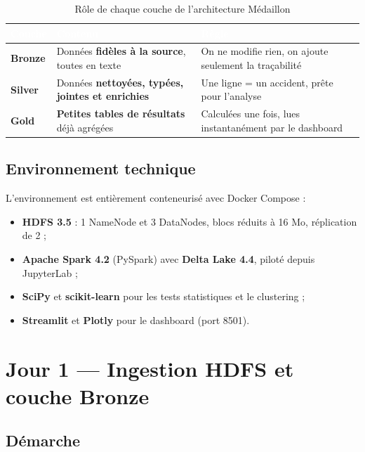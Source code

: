 \documentclass[11pt,a4paper]{report}
\newcommand{\hd}[1]{\textcolor{white}{\bfseries #1}}
\newcommand{\headrow}{\rowcolor{primary}}
\begin{document}
\begin{table}[H]
\centering
{}
\begin{tabularx}{\textwidth}{@{}l X X@{}}
\toprule
\headrow \hd{Couche} & \hd{Contenu} & \hd{Règle} \\
\midrule
\textcolor{bronzec}{\bfseries Bronze} & Données \textbf{fidèles à la source}, toutes en texte & On ne modifie rien, on ajoute seulement la traçabilité \\
\textcolor{silverc!70!black}{\bfseries Silver} & Données \textbf{nettoyées, typées, jointes et enrichies} & Une ligne = un accident, prête pour l'analyse \\
\textcolor{goldc!80!black}{\bfseries Gold} & \textbf{Petites tables de résultats} déjà agrégées & Calculées une fois, lues instantanément par le dashboard \\
\bottomrule
\end{tabularx}
\caption{Rôle de chaque couche de l'architecture Médaillon}
\end{table}

\section{Environnement technique}

L'environnement est entièrement conteneurisé avec Docker Compose :
\begin{itemize}
  \item \textbf{HDFS 3.5} : 1 NameNode et 3 DataNodes, blocs réduits à 16 Mo, réplication de 2 ;
  \item \textbf{Apache Spark 4.2} (PySpark) avec \textbf{Delta Lake 4.4}, piloté depuis JupyterLab ;
  \item \textbf{SciPy} et \textbf{scikit-learn} pour les tests statistiques et le clustering ;
  \item \textbf{Streamlit} et \textbf{Plotly} pour le dashboard (port 8501).
\end{itemize}

\chapter{Jour 1 — Ingestion HDFS et couche Bronze}

\section{Démarche}
\end{document}
